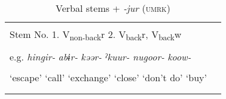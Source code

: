 \begin{table}
\caption{\label{tab:key:62} Verbal stems + \textit{-jur}  (\textsc{umrk})}

\begin{tabular}{ll}
\lsptoprule                                                                                                                                                                                                                                                              \\
Stem No.  1. V\textsubscript{non-back}r  2. V\textsubscript{back}r, V\textsubscript{back}w                                                                                                                                                                    \\
                                                                                                                                                                                                                                                              \\
e.g.  \textit{hingir-}  \textit{abɨr-}  \textit{kəər-}  \textit{ˀkuur-}  \textit{nugoor-}  \textit{koow-}                                                                                                                                                     \\
                                                                                                                                                                                                                                                              \\
  ‘escape’  ‘call’  ‘exchange’  ‘close’  ‘don’t do’  ‘buy’                                                                                                                                                                                                    \\
                                                                                                                                                                                                                                                              \\
\midrule                                                                                                                                                                                                                                                      \\

\end{tabular}
\end{table}
